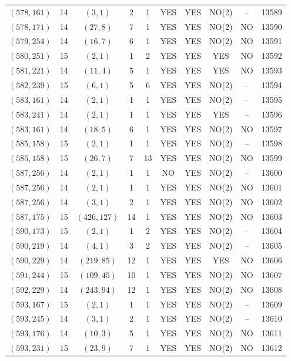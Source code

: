 \begin{longtable}{|c|c|c|c|c|c|c|c|c|c|}
$(578, 161)$ & 14 & $(3, 1)$ & 2 & 1 & YES & YES & NO(2) & -- & 13589\\
$(578, 171)$ & 14 & $(27, 8)$ & 7 & 1 & YES & YES & NO(2) & NO & 13590\\
$(579, 254)$ & 14 & $(16, 7)$ & 6 & 1 & YES & YES & NO(2) & NO & 13591\\
$(580, 251)$ & 15 & $(2, 1)$ & 1 & 2 & YES & YES & YES & NO & 13592\\
$(581, 221)$ & 14 & $(11, 4)$ & 5 & 1 & YES & YES & YES & NO & 13593\\
$(582, 239)$ & 15 & $(6, 1)$ & 5 & 6 & YES & YES & NO(2) & -- & 13594\\
$(583, 161)$ & 14 & $(2, 1)$ & 1 & 1 & YES & YES & NO(2) & -- & 13595\\
$(583, 241)$ & 14 & $(2, 1)$ & 1 & 1 & YES & YES & YES & -- & 13596\\
$(583, 161)$ & 14 & $(18, 5)$ & 6 & 1 & YES & YES & NO(2) & NO & 13597\\
$(585, 158)$ & 15 & $(2, 1)$ & 1 & 1 & YES & YES & NO(2) & -- & 13598\\
$(585, 158)$ & 15 & $(26, 7)$ & 7 & 13 & YES & YES & NO(2) & NO & 13599\\
$(587, 256)$ & 14 & $(2, 1)$ & 1 & 1 & NO & YES & NO(2) & -- & 13600\\
$(587, 256)$ & 14 & $(2, 1)$ & 1 & 1 & YES & YES & NO(2) & NO & 13601\\
$(587, 256)$ & 14 & $(3, 1)$ & 2 & 1 & YES & YES & NO(2) & NO & 13602\\
$(587, 175)$ & 15 & $(426, 127)$ & 14 & 1 & YES & YES & NO(2) & NO & 13603\\
$(590, 173)$ & 15 & $(2, 1)$ & 1 & 2 & YES & YES & NO(2) & -- & 13604\\
$(590, 219)$ & 14 & $(4, 1)$ & 3 & 2 & YES & YES & NO(2) & -- & 13605\\
$(590, 229)$ & 14 & $(219, 85)$ & 12 & 1 & YES & YES & YES & NO & 13606\\
$(591, 244)$ & 15 & $(109, 45)$ & 10 & 1 & YES & YES & NO(2) & NO & 13607\\
$(592, 229)$ & 14 & $(243, 94)$ & 12 & 1 & YES & YES & NO(2) & NO & 13608\\
$(593, 167)$ & 15 & $(2, 1)$ & 1 & 1 & YES & YES & NO(2) & -- & 13609\\
$(593, 245)$ & 14 & $(3, 1)$ & 2 & 1 & YES & YES & NO(2) & -- & 13610\\
$(593, 176)$ & 14 & $(10, 3)$ & 5 & 1 & YES & YES & NO(2) & NO & 13611\\
$(593, 231)$ & 15 & $(23, 9)$ & 7 & 1 & YES & YES & NO(2) & NO & 13612\\

\end{longtable}
